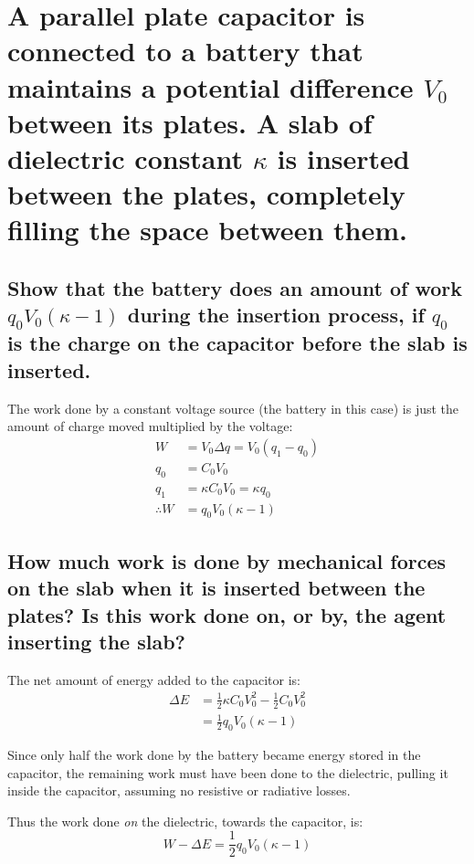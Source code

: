 \documentclass[a4paper]{scrartcl}
\begin{document}
\section{A parallel plate capacitor is connected to a battery that maintains a potential difference \(V_0\) between its plates. A slab of dielectric constant \(\kappa\) is inserted between the plates, completely filling the space between them.}
\subsection{Show that the battery does an amount of work \(q_0 V_0 (\kappa - 1)\) during the insertion process, if \(q_0\) is the charge on the capacitor before the slab is inserted.}
The work done by a constant voltage source (the battery in this case) is just the amount of charge moved multiplied by the voltage:
\begin{align*}
    W &= V_0 \Delta q = V_0 (q_1 - q_0) \\
    q_0 &= C_0 V_0 \\
    q_1 &= \kappa C_0 V_0 = \kappa q_0 \\
    \therefore W &= q_0 V_0 (\kappa - 1)
\end{align*}

\subsection{How much work is done by mechanical forces on the slab when it is inserted between the plates? Is this work done on, or by, the agent inserting the slab?}
The net amount of energy added to the capacitor is:
\begin{align*}
    \Delta E &= \frac{1}{2} \kappa C_0 V_0^2 - \frac{1}{2} C_0 V_0^2 \\
    &= \frac{1}{2} q_0 V_0 (\kappa - 1)
\end{align*}

Since only half the work done by the battery became energy stored in the capacitor, the remaining work must have been done to the dielectric, pulling it inside the capacitor, assuming no resistive or radiative losses.

Thus the work done \emph{on} the dielectric, towards the capacitor, is:
\[W - \Delta E = \frac{1}{2} q_0 V_0 (\kappa - 1)\]
\end{document}

